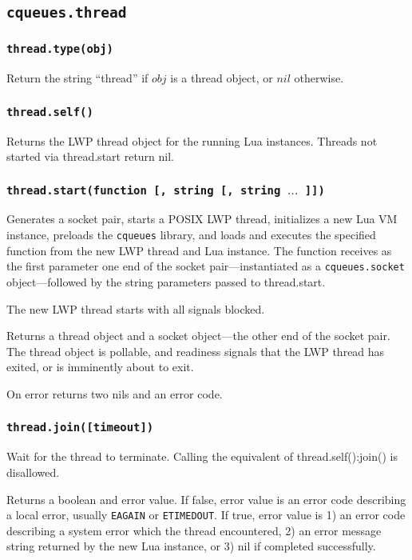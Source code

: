 \documentclass[11pt, oneside]{memoir}
\newcommand*{\cqueues}[0]{\texttt{cqueues}\xspace}
\newcommand*{\routine}[1]{\texttt{#1}\xspace}
\newcommand*{\fn}[1]{\texttt{#1}\xspace}
\newcommand*{\module}[1]{\texttt{#1}\xspace}
\newcommand*{\errno}[1]{\texttt{#1}\xspace}
\newcounter{toccols}
\newenvironment{Module}[1]{
	\subsection{\texttt{#1}}
	\addtocontents{toc}{
		\protect\begin{multicols}{\value{toccols}}
	}
}{
	\addtocontents{toc}{\protect\end{multicols}}
}
\begin{document}
\begin{Module}{cqueues.thread}

\subsubsection[\routine{thread.type}]{\routine{thread.type(obj)}}
Return the string ``thread'' if $obj$ is a thread object, or $nil$ otherwise.

\subsubsection[\fn{thread.self}]{\fn{thread.self()}}
Returns the LWP thread object for the running Lua instances. Threads not started via thread.start return nil.

\subsubsection[\fn{thread.start}]{\fn{thread.start(function [, string [, string $\ldots$ ]])}}
Generates a socket pair, starts a POSIX LWP thread, initializes a new Lua VM instance, preloads the \cqueues library, and loads and executes the specified function from the new LWP thread and Lua instance. The function receives as the first parameter one end of the socket pair---instantiated as a \module{cqueues.socket} object---followed by the string parameters passed to thread.start.

The new LWP thread starts with all signals blocked.

Returns a thread object and a socket object---the other end of the socket pair. The thread object is pollable, and readiness signals that the LWP thread has exited, or is imminently about to exit.

On error returns two nils and an error code.

\subsubsection[\fn{thread:join}]{\fn{thread.join([timeout])}}
Wait for the thread to terminate. Calling the equivalent of thread.self():join() is disallowed.

Returns a boolean and error value. If false, error value is an error code describing a local error, usually \errno{EAGAIN} or \errno{ETIMEDOUT}. If true, error value is 1) an error code describing a system error which the thread encountered, 2) an error message string returned by the new Lua instance, or 3) nil if completed successfully.

\end{Module}
\end{document}
